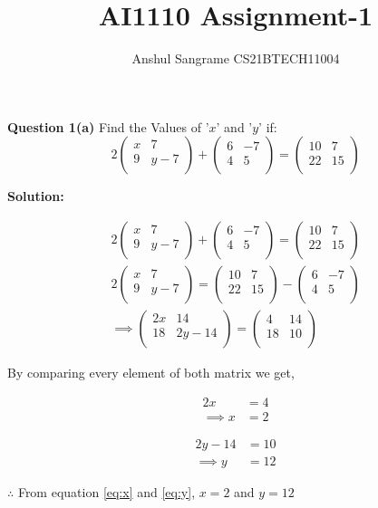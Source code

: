 \documentclass[journal,12pt,twocolumn]{IEEEtran}
\title{AI1110 Assignment-1}
\author{Anshul Sangrame CS21BTECH11004}
\newcommand{\myvec}[1]{\ensuremath{\begin{pmatrix}#1\end{pmatrix}}}
\newcommand{\solution}{\noindent \textbf{Solution: }}
\begin{document}
\maketitle

\noindent \textbf{Question 1(a)} Find the Values of '$x $' and '$y $' if: 
$$
2
\myvec{
x & 7 \\
9 & y-7 \\
}
+
\myvec{
6 & -7 \\
4 & 5 \\
}
=
\myvec{
10 & 7 \\
22 & 15 \\
}
$$

\solution


\begin{align}
2
\myvec{
x & 7 \\
9 & y-7 \\
}
+
\myvec{
6 & -7 \\
4 & 5 \\
}
=
\myvec{
10 & 7 \\
22 & 15 \\
}
\\
2
\myvec{
x & 7 \\
9 & y-7 \\
}
=
\myvec{
10 & 7 \\
22 & 15 \\
}
-
\myvec{
6 & -7 \\
4 & 5 \\
}
\\
\implies
\myvec{
2x & 14 \\
18 & 2y-14 \\
}
=
\myvec{
4 & 14\\
18 & 10\\
}
\end{align}


\noindent By comparing every element of both matrix we get,

\begin{align}
2x &= 4\\
\label{eq:x}
\implies
x &= 2
\end{align}

\begin{align}
2y-14 &= 10\\
\label{eq:y}
\implies
y &= 12
\end{align}


\noindent $ \therefore$ From equation \eqref{eq:x} and \eqref{eq:y},  $x = 2$ and $y=12 $
\end{document}

